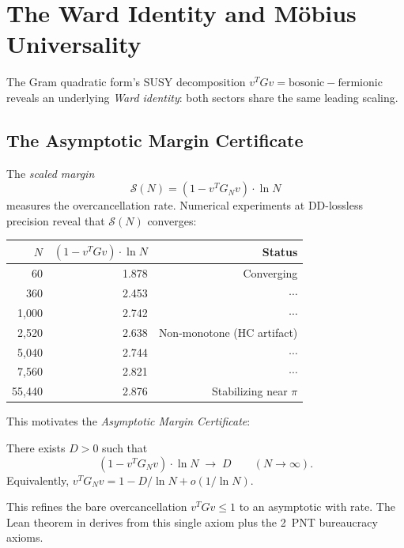 \documentclass[11pt,a4paper]{article}
\begin{document}
\section{The Ward Identity and M\"obius Universality}
\label{sec:ward}

The Gram quadratic form's SUSY decomposition
$v^T G v = \mathrm{bosonic} - \mathrm{fermionic}$
reveals an underlying \emph{Ward identity}: both sectors share the
same leading scaling.

\subsection{The Asymptotic Margin Certificate}

The \emph{scaled margin}
\[
  \mathcal{S}(N) = (1 - v^T G_N v) \cdot \ln N
\]
measures the overcancellation rate. Numerical experiments at
DD-lossless precision reveal that $\mathcal{S}(N)$ converges:

\begin{center}
\begin{tabular}{@{}rrr@{}}
\toprule
$N$ & $(1 - v^T G v) \cdot \ln N$ & Status \\
\midrule
60 & 1.878 & Converging \\
360 & 2.453 & $\cdots$ \\
1{,}000 & 2.742 & $\cdots$ \\
2{,}520 & 2.638 & Non-monotone (HC artifact) \\
5{,}040 & 2.744 & $\cdots$ \\
7{,}560 & 2.821 & $\cdots$ \\
55{,}440 & 2.876 & Stabilizing near $\pi$ \\
\bottomrule
\end{tabular}
\end{center}

\noindent
This motivates the \emph{Asymptotic Margin Certificate}:

\begin{axiombox}
\label{ax:margin}
There exists $D > 0$ such that
\[
  (1 - v^T G_N v) \cdot \ln N \;\to\; D \qquad (N \to \infty).
\]
Equivalently, $v^T G_N v = 1 - D/\ln N + o(1/\ln N)$.
\end{axiombox}

\noindent
This refines the bare overcancellation $v^T G v \leq 1$ to an
asymptotic with rate. The Lean theorem
 in 
derives  from this single axiom plus
the 2~PNT bureaucracy axioms.
\end{document}
